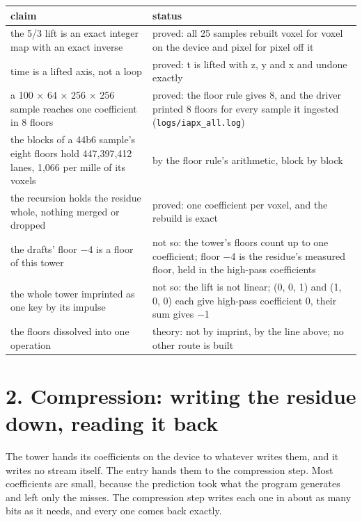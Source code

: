 {\small
\setlength{\tabcolsep}{6pt}
\begin{longtable}{>{\RaggedRight\arraybackslash}p{}>{\RaggedRight\arraybackslash}p{}}
\toprule
claim & status \\
\midrule
\endhead
the 5/3 lift is an exact integer map with an exact inverse & proved: all 25 samples rebuilt voxel for voxel on the device and pixel for pixel off it \\
time is a lifted axis, not a loop & proved: t is lifted with z, y and x and undone exactly \\
a 100 × 64 × 256 × 256 sample reaches one coefficient in 8 floors & proved: the floor rule gives 8, and the driver printed 8 floors for every sample it ingested (\texttt{logs/\allowbreak{}iapx\_\allowbreak{}all.\allowbreak{}log}) \\
the blocks of a 44b6 sample's eight floors hold 447,397,412 lanes, 1,066 per mille of its voxels & by the floor rule's arithmetic, block by block \\
the recursion holds the residue whole, nothing merged or dropped & proved: one coefficient per voxel, and the rebuild is exact \\
the drafts' floor −4 is a floor of this tower & not so: the tower's floors count up to one coefficient; floor −4 is the residue's measured floor, held in the high-pass coefficients \\
the whole tower imprinted as one key by its impulse & not so: the lift is not linear; (0, 0, 1) and (1, 0, 0) each give high-pass coefficient 0, their sum gives −1 \\
the floors dissolved into one operation & theory: not by imprint, by the line above; no other route is built \\
\bottomrule
\end{longtable}
}

\section{\texorpdfstring{2. Compression: writing the residue down, reading it back}{2. Compression: writing the residue down, reading it back}}

The tower hands its coefficients on the device to whatever writes them, and it writes no stream itself. The entry hands them to the compression step. Most coefficients are small, because the prediction took what the program generates and left only the misses. The compression step writes each one in about as many bits as it needs, and every one comes back exactly.

